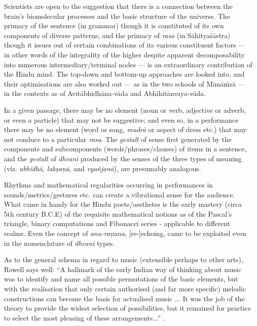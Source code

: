 Scientists are open to the suggestion that there is a connection between the brain's biomolecular processes and the basic structure of the universe. The primacy of the sentence (in grammar) though it is constituted of its own components of diverse patterns, and the primacy of \textsl{rasa} (in Sāhityaśāstra) though it issues out of certain combinations of its various constituent factors --- in other words of the integrality of the higher despite apparent decomposability into numerous intermediary/terminal nodes --- is an extraordinary contribution of the Hindu mind. The top-down and bottom-up approaches are looked into, and their optimisations are also worked out --- as in the two schools of Mīmāṁsā --- in the contexts as of Avitābhidhāna-vāda and Abhihitānvaya-vāda.

In a given passage, there may be no element (noun or verb, adjective or adverb, or even a particle) that may not be suggestive; and even so, in a performance there may be no element (word or song, \textsl{mudrā} or aspect of dress etc.) that may not conduce to a particular \textsl{rasa}. The \textsl{gestalt} of sense first generated by the components and subcomponents (words/phrases/clauses) of items in a sentence, and the \textsl{gestalt} of \textsl{dhvani} produced by the senses of the three types of meaning (viz. \textsl{abhidhā, lakṣaṇā}, and \textsl{vyañjanā}), are presumably analogous.

Rhythms and mathematical regularities occurring in performances in sounds/metrics/gestures etc. can create a vibrational sense for the audience. What came in handy for the Hindu poets/aesthetes is the early mastery (circa 5th century B.C.E) of the requisite mathematical notions as of the Pascal’s triangle, binary computations and Fibonacci series - applicable to different realms. Even the concept of \textsl{anu-raṇana}, [re-]echoing, came to be exploited even in the nomenclature of \textsl{dhvani} types. 

As to the general schema in regard to music (extensible perhaps to other arts), Rowell says well: “A hallmark of the early Indian way of thinking about music was to identify and name all possible permutations of the basic elements, but with the realisation that only certain authorised (and far more specific) melodic constructions can become the basis for actualised music ... It was the job of the theory to provide the widest selection of possibilities, but it remained for practice to select the most pleasing of these arrangements...” .

